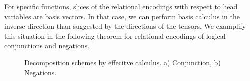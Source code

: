 \label{sec:effectiveCalculus} %



For specific functions, slices of the relational encodings with respect to head variables are basis vectors.
In that case, we can perform basis calculus in the inverse direction than suggested by the directions of the tensors.
We examplify this situation in the following theorem for relational encodings of logical conjunctions and negations.

\begin{figure}
\begin{center}
	
\end{center}
\caption{Decomposition schemes by effecitve calculus. a) Conjunction, b) Negations.}\label{fig:ConNegDecomposition}
\end{figure}

